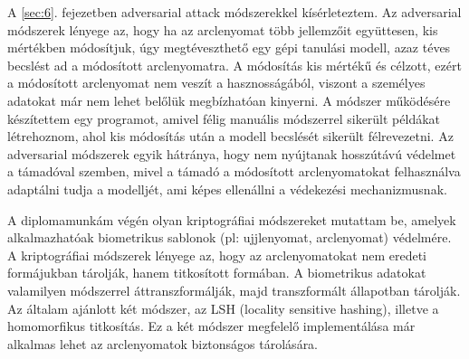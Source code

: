 A \ref{sec:6}. fejezetben adversarial attack módszerekkel kísérleteztem. Az adversarial módszerek lényege az, hogy ha az arclenyomat több jellemzőit együttesen, kis mértékben módosítjuk, úgy megtéveszthető egy gépi tanulási modell, azaz téves becslést ad a módosított arclenyomatra. A módosítás kis mértékű és célzott, ezért a módosított arclenyomat nem veszít a hasznosságából, viszont a személyes adatokat már nem lehet belőlük megbízhatóan kinyerni. A módszer működésére készítettem egy programot, amivel félig manuális módszerrel sikerült példákat létrehoznom, ahol kis módosítás után a modell becslését sikerült félrevezetni. Az adversarial módszerek egyik hátránya, hogy nem nyújtanak hosszútávú védelmet a támadóval szemben, mivel a támadó a módosított arclenyomatokat felhasználva adaptálni tudja a modelljét, ami képes ellenállni a védekezési mechanizmusnak.

A diplomamunkám végén olyan kriptográfiai módszereket mutattam be, amelyek alkalmazhatóak biometrikus sablonok (pl: ujjlenyomat, arclenyomat) védelmére. A kriptográfiai módszerek lényege az, hogy az arclenyomatokat nem eredeti formájukban tárolják, hanem titkosított formában. A biometrikus adatokat valamilyen módszerrel áttranszformálják, majd transzformált állapotban tárolják. Az általam ajánlott két módszer, az LSH (locality sensitive hashing), illetve a homomorfikus titkosítás. Ez a két módszer megfelelő implementálása már alkalmas lehet az arclenyomatok biztonságos tárolására.







